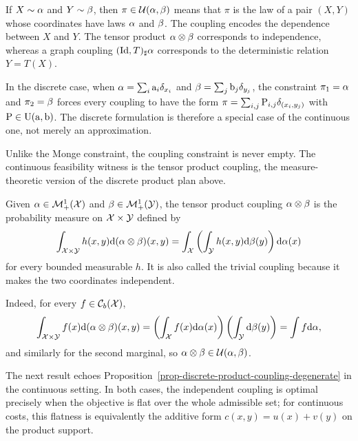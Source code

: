 \begin{rem}
	If $X\sim\alpha$ and $Y\sim\beta$, then $\pi\in\mathcal{U}(\alpha,\beta)$ means that $\pi$ is the law of a pair $(X,Y)$ whose coordinates have laws $\alpha$ and $\beta$. The coupling encodes the dependence between $X$ and $Y$. The tensor product $\alpha\otimes\beta$ corresponds to independence, whereas a graph coupling $(\mathrm{Id},T)_\sharp\alpha$ corresponds to the deterministic relation $Y=T(X)$.

	In the discrete case, when $\alpha=\sum_i \mathrm{a}_i\delta_{x_i}$ and $\beta=\sum_j \mathrm{b}_j\delta_{y_j}$, the constraint $\pi_1=\alpha$ and $\pi_2=\beta$ forces every coupling to have the form $\pi=\sum_{i,j}\mathrm{P}_{i,j}\delta_{(x_i,y_j)}$ with $\mathrm{P}\in\mathrm{U}(\mathrm{a},\mathrm{b})$. The discrete formulation is therefore a special case of the continuous one, not merely an approximation.
\end{rem}

Unlike the Monge constraint, the coupling constraint is never empty. The continuous feasibility witness is the tensor product coupling, the measure-theoretic version of the discrete product plan above.

\begin{defn}\label{def-tensor-product-coupling}
	Given $\alpha\in\mathcal{M}_+^1(\mathcal{X})$ and $\beta\in\mathcal{M}_+^1(\mathcal{Y})$, the tensor product coupling $\alpha\otimes\beta$ is the probability measure on $\mathcal{X}\times\mathcal{Y}$ defined by
	\[
		\int_{\mathcal{X}\times\mathcal{Y}} h(x,y)\mathrm{d}(\alpha\otimes\beta)(x,y)
		=
		\int_{\mathcal{X}}\left(\int_{\mathcal{Y}} h(x,y)\mathrm{d}\beta(y)\right)\mathrm{d}\alpha(x)
	\]
	for every bounded measurable $h$. It is also called the trivial coupling because it makes the two coordinates independent.
\end{defn}
Indeed, for every $f\in\mathcal{C}_b(\mathcal{X})$,
\[
	\int_{\mathcal{X}\times\mathcal{Y}} f(x)\mathrm{d}(\alpha\otimes\beta)(x,y)
	=
	\left(\int_{\mathcal{X}} f(x)\mathrm{d}\alpha(x)\right)\left(\int_{\mathcal{Y}}\mathrm{d}\beta(y)\right)
	=
	\int f\mathrm{d}\alpha,
\]
and similarly for the second marginal, so $\alpha\otimes\beta\in\mathcal{U}(\alpha,\beta)$.

The next result echoes Proposition~\ref{prop-discrete-product-coupling-degenerate} in the continuous setting. In both cases, the independent coupling is optimal precisely when the objective is flat over the whole admissible set; for continuous costs, this flatness is equivalently the additive form $c(x,y)=u(x)+v(y)$ on the product support.

